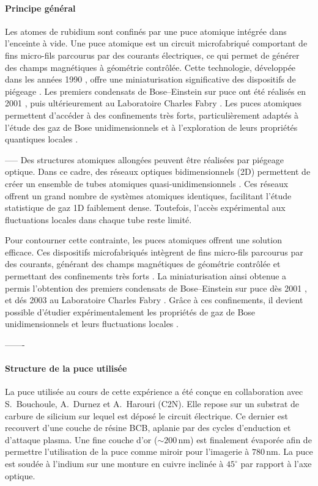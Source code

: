 \paragraph{Principe général}
Les atomes de rubidium sont confinés par une puce atomique intégrée dans l’enceinte à vide. Une puce atomique est un circuit microfabriqué comportant de fins micro-fils parcourus par des courants électriques, ce qui permet de générer des champs magnétiques à géométrie contrôlée. Cette technologie, développée dans les années 1990 \cite{Denschlag1999,Fortagh1998}, offre une miniaturisation significative des dispositifs de piégeage \cite{Folman2000,Reichel1999}. Les premiers condensats de Bose–Einstein sur puce ont été réalisés en 2001 \cite{Haensel2001,Ott2001}, puis ultérieurement au Laboratoire Charles Fabry \cite{Aussibal2003}. Les puces atomiques permettent d’accéder à des confinements très forts, particulièrement adaptés à l’étude des gaz de Bose unidimensionnels et à l’exploration de leurs propriétés quantiques locales \cite{Schumm2005,Trebbia2006}.


-----
Des structures atomiques allongées peuvent être réalisées par piégeage optique. Dans ce cadre, des réseaux optiques bidimensionnels (2D) permettent de créer un ensemble de tubes atomiques quasi-unidimensionnels \cite{Kinoshita2004,LaburtheTolra2004,Paredes2004,Moritz2003}. Ces réseaux offrent un grand nombre de systèmes atomiques identiques, facilitant l’étude statistique de gaz 1D faiblement dense. Toutefois, l’accès expérimental aux fluctuations locales dans chaque tube reste limité.

Pour contourner cette contrainte, les puces atomiques offrent une solution efficace. Ces dispositifs microfabriqués intègrent de fins micro-fils parcourus par des courants, générant des champs magnétiques de géométrie contrôlée et permettant des confinements très forts \cite{Denschlag1999,Fortagh1998,Folman2000,Reichel1999}. La miniaturisation ainsi obtenue a permis l’obtention des premiers condensats de Bose–Einstein sur puce dès 2001 \cite{Haensel2001,Ott2001}, et dés 2003 au Laboratoire Charles Fabry \cite{Aussibal2003}. Grâce à ces confinements, il devient possible d’étudier expérimentalement les propriétés de gaz de Bose unidimensionnels et leurs fluctuations locales \cite{Schumm2005,Trebbia2006}.

-------

\paragraph{Structure de la puce utilisée}
La puce utilisée au cours de cette expérience a été conçue en collaboration avec S.~Bouchoule, A.~Durnez et A.~Harouri (C2N). Elle repose sur un substrat de carbure de silicium sur lequel est déposé le circuit électrique. Ce dernier est recouvert d’une couche de résine BCB, aplanie par des cycles d’enduction et d’attaque plasma. Une fine couche d’or (\(\sim200\,\mathrm{nm}\)) est finalement évaporée afin de permettre l’utilisation de la puce comme miroir pour l’imagerie à \(780\,\mathrm{nm}\). La puce est soudée à l’indium sur une monture en cuivre inclinée à \(45^\circ\) par rapport à l’axe optique.

